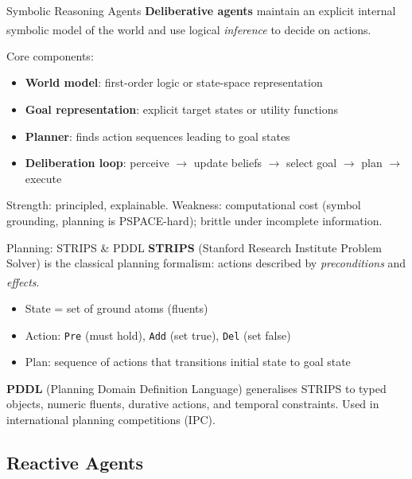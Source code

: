 \begin{v3topic}{Symbolic Reasoning Agents}
    \textbf{Deliberative agents} maintain an explicit internal symbolic model
    of the world and use logical \emph{inference} to decide on
    actions.\textsuperscript{\cite[][p.~58]{wooldridgeIntroductionMultiAgentSystems2009}}

    Core components:
    \begin{itemize}
        \item \textbf{World model}: first-order logic or state-space representation
        \item \textbf{Goal representation}: explicit target states or utility functions
        \item \textbf{Planner}: finds action sequences leading to goal states
        \item \textbf{Deliberation loop}: perceive $\to$ update beliefs $\to$ select goal $\to$ plan $\to$ execute
    \end{itemize}
    Strength: principled, explainable.
    Weakness: computational cost (symbol grounding, planning is PSPACE-hard); brittle under incomplete information.

\end{v3topic}
\begin{v3topic}{Planning: STRIPS \& PDDL}
    \textbf{STRIPS} (Stanford Research Institute Problem Solver) is the classical
    planning formalism: actions described by \emph{preconditions} and
    \emph{effects}.\textsuperscript{\cite[][p.~62]{wooldridgeIntroductionMultiAgentSystems2009}}

    \begin{itemize}
        \item State = set of ground atoms (fluents)
        \item Action: \texttt{Pre} (must hold), \texttt{Add} (set true), \texttt{Del} (set false)
        \item Plan: sequence of actions that transitions initial state to goal state
    \end{itemize}
    \textbf{PDDL} (Planning Domain Definition Language) generalises STRIPS to
    typed objects, numeric fluents, durative actions, and temporal constraints.
    Used in international planning competitions (IPC).

\end{v3topic}

\subsection{Reactive Agents}

